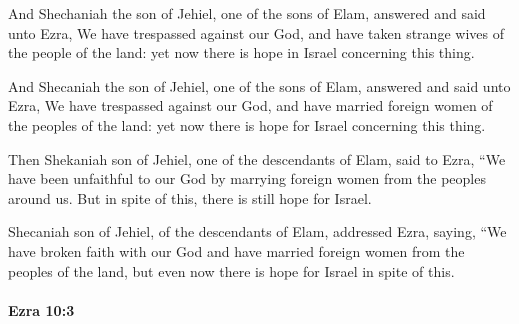 			And Shechaniah the son of Jehiel, one of the sons of Elam, answered and said unto Ezra, We have trespassed against our God, and have taken strange wives of the people of the land: yet now there is hope in Israel concerning this thing.

			\begin{versebox}
					\item[BHS] 
					\item[LXX] 
					\item[ASV] And Shecaniah the son of Jehiel, one of the sons of Elam, answered and said unto Ezra, We have trespassed against our God, and have married foreign women of the peoples of the land: yet now there is hope for Israel concerning this thing.
					\item[NIV] Then Shekaniah son of Jehiel, one of the descendants of Elam, said to Ezra, “We have been unfaithful to our God by marrying foreign women from the peoples around us. But in spite of this, there is still hope for Israel.
					\item[NRSV] Shecaniah son of Jehiel, of the descendants of Elam, addressed Ezra, saying, “We have broken faith with our God and have married foreign women from the peoples of the land, but even now there is hope for Israel in spite of this.
			\end{versebox}

		\paragraph{Ezra 10:3} %
			\label{EZRA-10-3}

